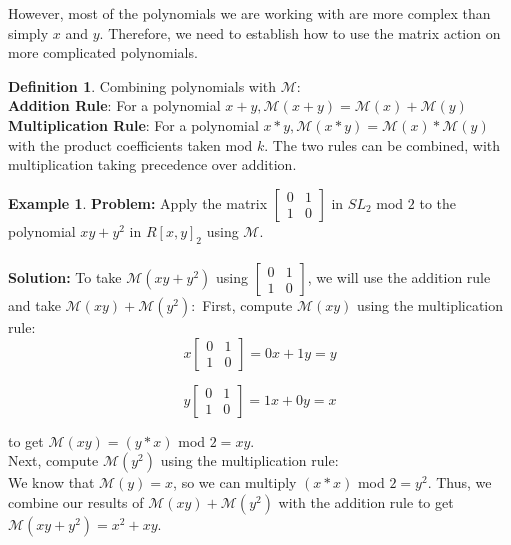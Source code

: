 \documentclass[a4paper,draft]{amsproc}
\theoremstyle{plain}
\theoremstyle{definition}
\newtheorem{exm}{Example}[section]
\newtheorem{dfn}{Definition}[section]
\theoremstyle{remark}
\numberwithin{equation}{section}
\begin{document}
However, most of the polynomials we are working with are more complex than simply $x$ and $y$. Therefore, we need to establish how to use the matrix action on more complicated polynomials. 
\begin{dfn}
Combining polynomials with $\mathcal{M}$:\\
\textbf{Addition Rule}: For a polynomial $x + y, \mathcal{M}(x + y) = \mathcal{M}(x) + \mathcal{M}(y)$ \\
\textbf{Multiplication Rule}: For a polynomial $x*y, \mathcal{M}(x*y) = \mathcal{M}(x) * \mathcal{M}(y)$ with the product coefficients taken mod $k$.
The two rules can be combined, with multiplication taking precedence over addition. 
\end{dfn}

\begin{exm}
\textbf{Problem:} 
Apply the matrix 
$\begin{bmatrix}
 0&1 \\ 
 1&0 
\end{bmatrix}$ in $SL_{2}$ mod $2$ to the polynomial $xy + y^{2}$ in $R[x,y]_{2}$ using $\mathcal{M}.$ \\ \\
\textbf{Solution:} 
To take $\mathcal{M}(xy + y^{2})$ using $\begin{bmatrix}
 0&1 \\ 
 1&0 
\end{bmatrix}$, we will use the addition rule and take $\mathcal{M}(xy) + \mathcal{M}(y^{2}):$ 
First, compute $\mathcal{M}(xy)$ using the multiplication rule: \\
$$x\begin{bmatrix}
 0&1 \\ 
 1&0 
\end{bmatrix} = 0x + 1y = y$$

$$y\begin{bmatrix}
 0&1 \\ 
 1&0 
\end{bmatrix} = 1x + 0y = x$$

to get  $\mathcal{M}(xy) = (y*x)$ mod $2 = xy$. \\

Next, compute $\mathcal{M}(y^{2})$ using the multiplication rule: \\
We know that $\mathcal{M}(y) = x$, so we can multiply $(x*x)$ mod $2 = y^{2}$. 
Thus, we combine our results of $\mathcal{M}(xy) + \mathcal{M}(y^{2})$ with the addition rule to get $\mathcal{M}(xy + y^{2}) = x^{2} + xy$. 

\end{exm}
\end{document}
